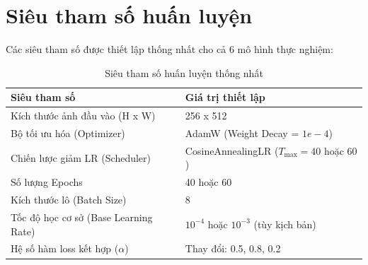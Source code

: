 \documentclass[a4paper,12pt]{report}
\begin{document}
\section{Siêu tham số huấn luyện}
Các siêu tham số được thiết lập thống nhất cho cả 6 mô hình thực nghiệm:
\begin{table}[H]
\centering
\caption{Siêu tham số huấn luyện thống nhất}
\label{tab:hyperparams}
\begin{tabular}{ll}
\toprule
\textbf{Siêu tham số} & \textbf{Giá trị thiết lập} \\
\midrule
Kích thước ảnh đầu vào (H x W) & 256 x 512 \\
Bộ tối ưu hóa (Optimizer) & AdamW (Weight Decay = $1e-4$) \\
Chiến lược giảm LR (Scheduler) & CosineAnnealingLR ($T_{\max} = 40$ hoặc $60$) \\
Số lượng Epochs & 40 hoặc 60 \\
Kích thước lô (Batch Size) & 8 \\
Tốc độ học cơ sở (Base Learning Rate) & $10^{-4}$ hoặc $10^{-3}$ (tùy kịch bản) \\
Hệ số hàm loss kết hợp ($\alpha$) & Thay đổi: 0.5, 0.8, 0.2 \\
\bottomrule
\end{tabular}
\end{table}
\end{document}
